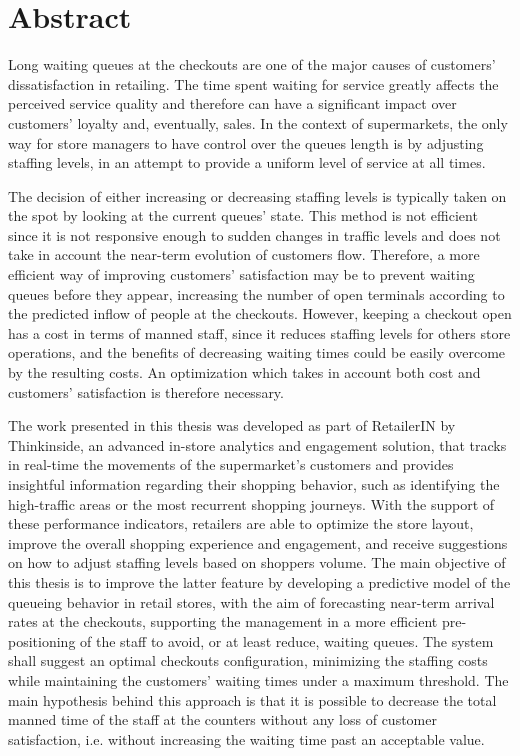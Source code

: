 \chapter*{Abstract}
\label{cha:abstract}


Long waiting queues at the checkouts are one of the major causes of customers’ dissatisfaction in retailing. The time spent waiting for service greatly affects the perceived service quality and therefore can have a significant impact over customers’ loyalty and, eventually, sales. In the context of supermarkets, the only way for store managers to have control over the queues length is by adjusting staffing levels, in an attempt to provide a uniform level of service at all times.

The decision of either increasing or decreasing staffing levels is typically taken on the spot by looking at the current queues’ state. This method is not efficient since it is not responsive enough to sudden changes in traffic levels  and does not take in account the near-term evolution of customers flow. Therefore, a more efficient way of improving customers’ satisfaction may be to prevent waiting queues before they appear, increasing the number of open terminals according to the predicted inflow of people at the checkouts. However, keeping a checkout open has a cost in terms of manned staff, since it reduces staffing levels for others store operations, and the benefits of decreasing waiting times could be easily overcome by the resulting costs. An optimization which takes in account both cost and customers’ satisfaction is therefore necessary.

The work presented in this thesis was developed as part of RetailerIN by Thinkinside, an advanced in-store analytics and engagement solution, that tracks in real-time the movements of the supermarket’s customers and provides insightful information regarding their shopping behavior, such as identifying the high-traffic areas or the most recurrent shopping journeys. With the support of these performance indicators, retailers are able to optimize the store layout, improve the overall shopping experience and engagement, and receive suggestions on how to adjust staffing levels based on shoppers volume. The main objective of this thesis is to improve the latter feature by developing a predictive model of the queueing behavior in retail stores, with the aim of forecasting near-term arrival rates at the checkouts, supporting the management in a more efficient pre-positioning of the staff to avoid, or at least reduce, waiting queues. The system shall suggest an optimal checkouts configuration, minimizing the staffing costs while maintaining the customers’ waiting times under a maximum threshold. The main hypothesis behind this approach is that it is possible to decrease the total manned time of the staff at the counters without any loss of customer satisfaction, i.e. without increasing the waiting time past an acceptable value.

